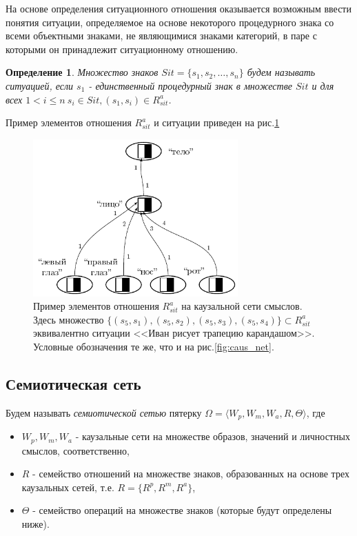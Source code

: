\documentclass[12pt]{scrartcl}
\newtheorem{definition}{Определение}
\begin{document}
	На основе определения ситуационного отношения оказывается возможным ввести понятия ситуации, определяемое на основе некоторого процедурного знака со всеми объектными знаками, не являющимися знаками категорий, в паре с которыми он принадлежит ситуационному отношению.
	
	\begin{definition}
		Множество знаков $Sit=\{s_1,s_2,\dots,s_n\}$ будем называть \textit{ситуацией}, если $s_1$ - единственный процедурный знак в множестве $Sit$ и для всех $1<i\leq n\ s_i\in Sit, (s_1,s_i)\in R_{sit}^a$.
	\end{definition}
	
	Пример элементов отношения $R_{sit}^a$ и ситуации приведен на рис.\ref{fig:mean_relat}

	\begin{figure}[h]
		\centering
		\includegraphics[width=0.7\textwidth,page=3]{examples/causnet/caus_net}
		\caption{Пример элементов отношения $R_{sit}^a$ на каузальной сети смыслов. Здесь множество $\{(s_5,s_1),(s_5,s_2),(s_5,s_3),(s_5,s_4)\}\subset R_{sit}^a$ эквивалентно ситуации <<Иван рисует трапецию карандашом>>. Условные обозначения те же, что и на рис.\ref{fig:caus_net}.}
		\label{fig:mean_relat}		
	\end{figure}
			
	\subsection{Семиотическая сеть}
	Будем называть \textit{семиотической сетью} пятерку $\Omega=\langle W_p, W_m, W_a, R, \Theta \rangle$, где
	\begin{itemize}
		\item $W_p, W_m, W_a$ - каузальные сети на множестве образов, значений и личностных смыслов, соответственно,
		\item $R$ - семейство отношений на множестве знаков, образованных на основе трех каузальных сетей, т.е. $R=\{R^p, R^m, R^a\}$,
		\item $\Theta$ - семейство операций на множестве знаков (которые будут определены ниже).
	\end{itemize} 
	
\end{document}
